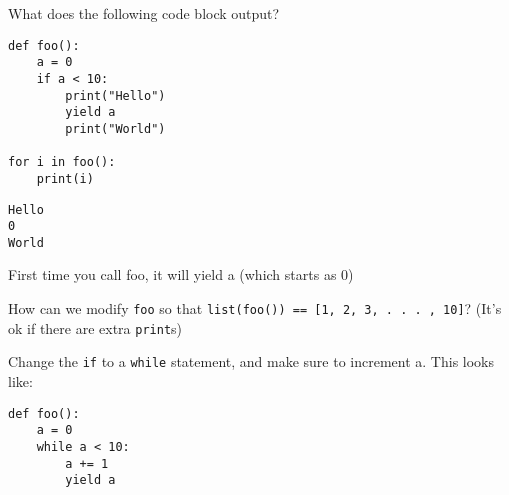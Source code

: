 \question What does the following code block output?
\begin{lstlisting}
def foo():
	a = 0
	if a < 10:
		print("Hello")
		yield a
		print("World")

for i in foo():
	print(i)
\end{lstlisting}

\begin{solution}[0.75in]
\begin{lstlisting}
Hello
0
World
\end{lstlisting}
First time you call foo, it will yield a (which starts as 0)
\end{solution}

\question How can we modify \texttt{foo} so that
\texttt{list(foo()) == [1, 2, 3, . . . , 10]}?
(It's ok if there are extra \texttt{print}s)

\begin{solution}[0.50in]
Change the \texttt{if} to a \texttt{while} statement, and make sure to increment
a. This looks like:

\begin{lstlisting}
def foo():
	a = 0
	while a < 10:
		a += 1
		yield a
\end{lstlisting}
\end{solution}
